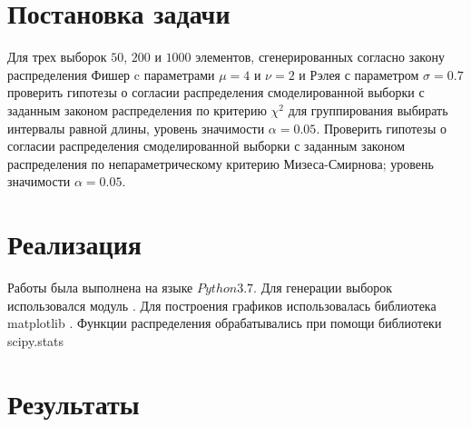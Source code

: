 \documentclass[a4]{article}
\renewcommand{\listoftables}{\begingroup %
\tocsection
\tocfile{\listtablename}{lot}
\endgroup}
\begin{document}
\newpage
\pagestyle{plain}




\newpage
\tableofcontents{}
\newpage
\listoftables{}
\newpage

\section{Постановка задачи}

Для трех выборок $50$, $200$ и $1000$ элементов, сгенерированных согласно закону распределения Фишер c параметрами $\mu = 4$ и $\nu = 2$ и Рэлея с параметром $\sigma = 0.7$ проверить гипотезы о согласии распределения смоделированной выборки с заданным законом распределения по критерию $\chi^2$ для группирования выбирать интервалы равной длины, уровень значимости $\alpha = 0.05$. Проверить гипотезы о согласии распределения смоделированной выборки с заданным законом распределения по непараметрическому критерию Мизеса-Смирнова; уровень значимости $\alpha = 0.05$. 

\section{Реализация}
Работы была выполнена на языке $Python 3.7.$
Для генерации выборок использовался модуль \cite{numpy}.
Для построения графиков использовалась библиотека matplotlib \cite{plotlib}.
Функции распределения обрабатывались при помощи библиотеки scipy.stats \cite{skp}

\section{Результаты}
\end{document}
